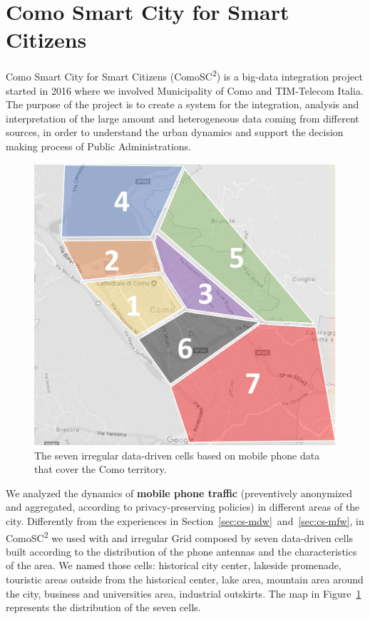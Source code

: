 {\section{Como Smart City for Smart Citizens} \label{sec:cs-como}
Como Smart City for Smart Citizens (ComoSC\textsuperscript{2}) is a big-data integration project started in 2016 where we involved Municipality of Como and TIM-Telecom Italia. The purpose of the project is to create a system for the integration, analysis and interpretation of the large amount and heterogeneous data coming from different sources, in order to understand the urban dynamics and support  the decision making process of Public Administrations.

\begin{figure}[t]
       \centering
        \includegraphics[width=.6\linewidth]{img/como-district}
        \caption{The seven irregular data-driven cells based on mobile phone data that cover the Como territory.}
        \label{fig:map1}
\end{figure}

We analyzed the dynamics of \textbf{mobile phone traffic} (preventively anonymized and aggregated, according to privacy-preserving policies) in different areas of the city. 
Differently from the experiences in Section~\ref{sec:cs-mdw}~and~\ref{sec:cs-mfw}, in ComoSC\textsuperscript{2} we used \frappe{} with and irregular Grid composed by seven data-driven cells built according to the distribution of the phone antennas and the characteristics of the area. 
We named those cells: historical city  center, lakeside promenade, touristic areas outside from the historical center, lake area, mountain area around the city, business and universities area, industrial outskirts.
The map in Figure~\ref{fig:map1} represents the distribution of the seven cells.

}
